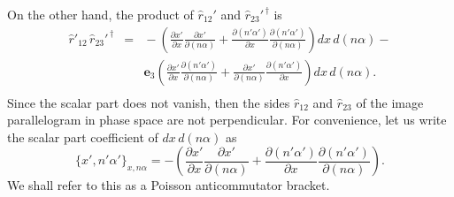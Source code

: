 \documentclass[11pt,twocolumn]{article}
\begin{document}
On the other hand, the product of $\hat r_{12}'$ and $\hat r_{23}'^{\,\dagger}$ is
\begin{eqnarray}
\label{eq:dr'_12 dr'_23 dagger height angle}
\hat r'_{12}\,\hat r_{23}'^{\,\dagger}\!\!\!\!&=&\!\!\!\!-\left(\frac{\partial x'}{\partial x}\frac{\partial x'}{\partial(n\alpha)}+ \frac{\partial(n'\alpha')}{\partial x}\frac{\partial(n'\alpha')}{\partial(n\alpha)}\right)dx\,d(n\alpha)-\nonumber\\
& &\!\!\!\!\mathbf e_3\left(\frac{\partial x'}{\partial x}\frac{\partial(n'\alpha')}{\partial(n\alpha)}+\frac{\partial x'}{\partial(n\alpha)}\frac{\partial(n'\alpha')}{\partial x}\right) dx\,d(n\alpha).\nonumber\\
\end{eqnarray}
Since the scalar part does not vanish, then the sides $\hat r_{12}$ and $\hat r_{23}$ of the image parallelogram in phase space are not perpendicular.  For convenience, let us write the scalar part coefficient of $dx\,d(n\alpha)$ as
\begin{equation}
\label{eq:Poisson bracket anticommutator x' n'alpha' wrt x nalpha}
\{x',n'\alpha'\}_{x,n\alpha}=-\left(\frac{\partial x'}{\partial x}\frac{\partial x'}{\partial(n\alpha)}+ \frac{\partial(n'\alpha')}{\partial x}\frac{\partial(n'\alpha')}{\partial(n\alpha)}\right).
\end{equation}
We shall refer to this as a Poisson anticommutator bracket.
\end{document}
